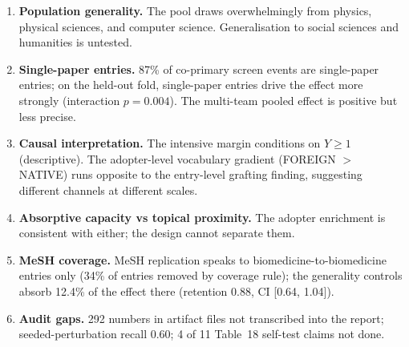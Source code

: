 \documentclass[11pt,letterpaper]{article}
\begin{document}
\begin{enumerate}
\setlength{\itemsep}{2pt}
\item \textbf{Population generality.} The pool draws overwhelmingly from physics, physical sciences, and computer science. Generalisation to social sciences and humanities is untested.
\item \textbf{Single-paper entries.} 87\% of co-primary screen events are single-paper entries; on the held-out fold, single-paper entries drive the effect more strongly (interaction $p = 0.004$). The multi-team pooled effect is positive but less precise.
\item \textbf{Causal interpretation.} The intensive margin conditions on $Y \geq 1$ (descriptive). The adopter-level vocabulary gradient (FOREIGN $>$ NATIVE) runs opposite to the entry-level grafting finding, suggesting different channels at different scales.
\item \textbf{Absorptive capacity vs topical proximity.} The adopter enrichment is consistent with either; the design cannot separate them.
\item \textbf{MeSH coverage.} MeSH replication speaks to biomedicine-to-biomedicine entries only (34\% of entries removed by coverage rule); the generality controls absorb 12.4\% of the effect there (retention 0.88, CI [0.64, 1.04]).
\item \textbf{Audit gaps.} 292 numbers in artifact files not transcribed into the report; seeded-perturbation recall 0.60; 4 of 11 Table~18 self-test claims not done.
\end{enumerate}
\end{document}
